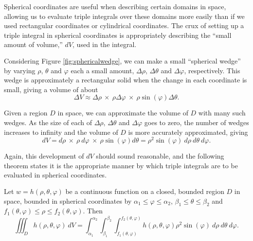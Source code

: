 Spherical coordinates are useful when describing certain domains in space, allowing us to evaluate triple integrals over these domains more easily than if we used rectangular coordinates or cylindrical coordinates. The crux of setting up a triple integral in spherical coordinates is appropriately describing the ``small amount of volume,'' $dV$, used in the integral.

Considering Figure \ref{fig:sphericalwedge}, we can make a small ``spherical wedge'' by varying $\rho$, $\theta$ and $\varphi$ each a small amount, $\Delta\rho$, $\Delta\theta$ and $\Delta\varphi$, respectively. This wedge is approximately a rectangular solid when the change in each coordinate is small, giving a volume of about
\[
\Delta V \approx \Delta\rho\ \times\ \rho\Delta\varphi\ \times\ \rho\sin(\varphi)\Delta\theta.
\]

Given a region $D$ in space, we can approximate the volume of $D$ with many such wedges. As the size of each of $\Delta\rho$, $\Delta\theta$ and $\Delta\varphi$ goes to zero, the number of wedges increases to infinity and the volume of $D$ is more accurately approximated, giving
\[
dV = d\rho\ \times\ \rho\ d\varphi\ \times\ \rho\sin(\varphi)d\theta = \rho^2\sin(\varphi)\ d\rho\ d\theta\ d\varphi.
\]

Again, this development of $dV$ should sound reasonable, and the following theorem states it is the appropriate manner by which triple integrals are to be evaluated in spherical coordinates.

{Let $w=h(\rho,\theta,\varphi)$ be a continuous function on a closed, bounded region $D$ in space, bounded in spherical coordinates by $\alpha_1 \leq \varphi \leq \alpha_2$, $\beta_1 \leq \theta \leq \beta_2$ and $f_1(\theta,\varphi) \leq \rho \leq f_2(\theta,\varphi)$. Then 
\[
\iiint_D h(\rho,\theta,\varphi)\ dV = \int_{\alpha_1}^{\alpha_2}\int_{\beta_1}^{\beta_2}\int_{f_1(\theta,\varphi)}^{f_2(\theta,\varphi)} h(\rho,\theta,\varphi) \rho^2\sin(\varphi)\ d\rho\ d\theta\ d\varphi.
\]
}

